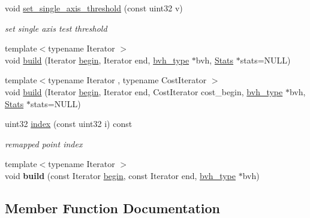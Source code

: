 \begin{DoxyCompactItemize}
void \hyperlink{classcugar_1_1_bvh__sah__builder_a41aae31b7766827a2034bc092f3ca2f0}{set\+\_\+single\+\_\+axis\+\_\+threshold} (const uint32 v)
\begin{DoxyCompactList}\small\item\em set single axis test threshold \end{DoxyCompactList}\item 
{\footnotesize template$<$typename Iterator $>$ }\\void \hyperlink{classcugar_1_1_bvh__sah__builder_a8a64c0b8144ac205dbc1b0879e3b41d1}{build} (Iterator \hyperlink{namespacecugar_a2121df08f967e232ea5fe0ee378dee67}{begin}, Iterator end, \hyperlink{structcugar_1_1_bvh}{bvh\+\_\+type} $\ast$bvh, \hyperlink{structcugar_1_1_bvh__sah__builder_1_1_stats}{Stats} $\ast$stats=N\+U\+LL)
\item 
{\footnotesize template$<$typename Iterator , typename Cost\+Iterator $>$ }\\void \hyperlink{classcugar_1_1_bvh__sah__builder_a2f0ebff9b2d6d0f9ada366c64689dc4e}{build} (Iterator \hyperlink{namespacecugar_a2121df08f967e232ea5fe0ee378dee67}{begin}, Iterator end, Cost\+Iterator cost\+\_\+begin, \hyperlink{structcugar_1_1_bvh}{bvh\+\_\+type} $\ast$bvh, \hyperlink{structcugar_1_1_bvh__sah__builder_1_1_stats}{Stats} $\ast$stats=N\+U\+LL)
\item 
\mbox{\label{classcugar_1_1_bvh__sah__builder_aad8a449457ea218c106bbc626efe9334}} 
uint32 \hyperlink{classcugar_1_1_bvh__sah__builder_aad8a449457ea218c106bbc626efe9334}{index} (const uint32 i) const
\begin{DoxyCompactList}\small\item\em remapped point index \end{DoxyCompactList}\item 
\mbox{\label{classcugar_1_1_bvh__sah__builder_a69f50ef39b8fd35d2ee03c5421360d63}} 
{\footnotesize template$<$typename Iterator $>$ }\\void {\bfseries build} (const Iterator \hyperlink{namespacecugar_a2121df08f967e232ea5fe0ee378dee67}{begin}, const Iterator end, \hyperlink{structcugar_1_1_bvh}{bvh\+\_\+type} $\ast$bvh)
\end{DoxyCompactItemize}


\subsection{Member Function Documentation}
\mbox{\label{classcugar_1_1_bvh__sah__builder_a8a64c0b8144ac205dbc1b0879e3b41d1}} 
